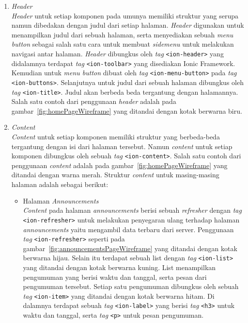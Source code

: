 	\begin{enumerate}
		\item \textit{Header} \\
			\textit{Header} untuk setiap komponen pada umunya memiliki struktur yang serupa namun dibedakan dengan judul dari setiap halaman. \textit{Header} digunakan untuk menampilkan judul dari sebuah halaman, serta menyediakan sebuah \textit{menu button} sebagai salah satu cara untuk membuat \textit{sidemenu} untuk melakukan navigasi antar halaman. \textit{Header} dibungkus oleh \textit{tag} \texttt{<ion-header>} yang didalamnya terdapat \textit{tag} \texttt{<ion-toolbar>} yang disediakan Ionic Framework. Kemudian untuk \textit{menu button} dibuat oleh \textit{tag} \texttt{<ion-menu-button>} pada \textit{tag} \texttt{<ion-buttons>}. Selanjutnya untuk judul dari sebuah halaman dibungkus oleh \textit{tag} \texttt{<ion-title>}. Judul akan berbeda beda tergantung dengan halamannya. Salah satu contoh dari penggunaan \textit{header} adalah pada gambar~\ref{fig:homePageWireframe} yang ditandai dengan kotak berwarna biru.
			\newpage
		\item \textit{Content} \\
			\textit{Content} untuk setiap komponen memiliki struktur yang berbeda-beda tergantung dengan isi dari halaman tersebut. Namun \textit{content} untuk setiap komponen dibungkus oleh sebuah \textit{tag} \texttt{<ion-content>}. Salah satu contoh dari penggunaan \textit{content} adalah pada gambar~\ref{fig:homePageWireframe} yang ditandai dengan warna merah. Struktur \textit{content} untuk masing-masing halaman adalah sebagai berikut:
			
			\begin{itemize}
				\item Halaman \textit{Announcements} \\
					\textit{Content} pada halaman \textit{announcements} berisi sebuah \textit{refresher} dengan \textit{tag} \texttt{<ion-refresher>} untuk melakukan penyegaran ulang terhadap halaman \textit{announcements} yaitu mengambil data terbaru dari server. Penggunaan \textit{tag} \texttt{<ion-refresher>} seperti pada gambar~\ref{fig:announcementsPageWireframe} yang ditandai dengan kotak berwarna hijau. Selain itu terdapat sebuah list dengan \textit{tag} \texttt{<ion-list>} yang ditandai dengan kotak berwarna kuning. List menampilkan pengumuman yang berisi waktu dan tanggal, serta pesan dari pengumuman tersebut. Setiap satu pengumuman dibungkus oleh sebuah \textit{tag} \texttt{<ion-item>} yang ditandai dengan kotak berwarna hitam. Di dalamnya terdapat sebuah \textit{tag} \texttt{<ion-label>} yang berisi \textit{tag} \texttt{<h3>} untuk waktu dan tanggal, serta \textit{tag} \texttt{<p>} untuk pesan pengumuman.		
				

\end{itemize}
\end{enumerate}
